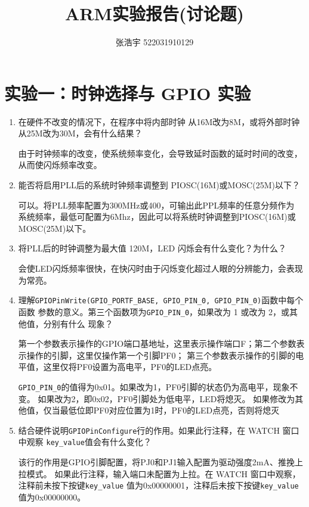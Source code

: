 \documentclass[12pt, a4paper, oneside]{ctexart}
\title{\textbf{ARM实验报告(讨论题)}}
\author{张浩宇 522031910129}
\date{}
\begin{document}
    \maketitle
    \section{实验一：时钟选择与 GPIO 实验}
    \begin{enumerate}[listparindent=2em]
        \item 在硬件不改变的情况下，在程序中将内部时钟
        从16M改为8M，或将外部时钟从25M改为30M，会有什么结果？
        
        {\kaishu 由于时钟频率的改变，使系统频率变化，会导致延时函数的延时时间的改变，从而使闪烁频率改变。}

        \item 能否将启用PLL后的系统时钟频率调整到
        PIOSC(16M)或MOSC(25M)以下？
        
        {\kaishu 可以。将PLL频率配置为300MHz或400，可输出此PPL频率的任意分频作为
        系统频率，最低可配置为6Mhz，因此可以将系统时钟调整到PIOSC(16M)或MOSC(25M)以下。}

        
        \item 将PLL后的时钟调整为最大值 120M，LED 闪烁会有什么变化？为什么？
        
        {\kaishu 会使LED闪烁频率很快，在快闪时由于闪烁变化超过人眼的分辨能力，会表现为常亮。}

        \item 理解\verb|GPIOPinWrite(GPIO_PORTF_BASE, GPIO_PIN_0, GPIO_PIN_0)|函数中每个函数
        参数的意义。第三个函数项为\verb|GPIO_PIN_0|，如果改为 1 或改为 2，或其他值，分别有什么
        现象？

        {\kaishu 第一个参数表示操作的GPIO端口基地址，这里表示操作端口F；第二个参数表示操作的引脚，这里仅操作第一个引脚PF0；
        第三个参数表示操作的引脚的电平值，这里仅将PF0设置为高电平，PF0的LED点亮。

        \verb|GPIO_PIN_0|的值得为0x01。如果改为1，PF0引脚的状态仍为高电平，现象不变。
        如果改为2，即0x02，PF0引脚处为低电平，LED将熄灭。
        如果修改为其他值，仅当最低位即PF0对应位置为1时，PF0的LED点亮，否则将熄灭
        }

        \item 结合硬件说明\verb|GPIOPinConfigure|行的作用。如果此行注释，在 WATCH 窗口中观察
        \verb|key_value|值会有什么变化？

        {\kaishu 该行的作用是GPIO引脚配置，将PJ0和PJ1输入配置为驱动强度2mA、推挽上拉模式。
        如果此行注释，输入端口未配置为上拉。在 WATCH 窗口中观察，注释前未按下按键\verb|key_value|
        值为0x00000001，注释后未按下按键\verb|key_value|值为0x00000000。}


\end{enumerate}
\end{document}
